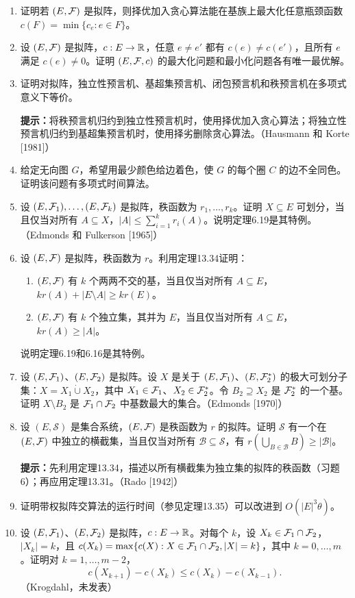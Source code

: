 \begin{enumerate}[label=\arabic*.,start=14]
\item 证明若 $(E,\mathcal F)$ 是拟阵，则择优加入贪心算法能在基族上最大化任意瓶颈函数 $c(F)=\min\{c_e:e\in F\}$。
\item 设 $(E,\mathcal F)$ 是拟阵，$c:E\to\mathbb R$，任意 $e\ne e'$ 都有 $c(e)\ne c(e')$，且所有 $e$ 满足 $c(e)\ne0$。证明 $(E,\mathcal F,c)$ 的最大化问题和最小化问题各有唯一最优解。
\item[$16.^*$] 证明对拟阵，独立性预言机、基超集预言机、闭包预言机和秩预言机在多项式意义下等价。\par
\textbf{提示：}将秩预言机归约到独立性预言机时，使用择优加入贪心算法；将独立性预言机归约到基超集预言机时，使用择劣删除贪心算法。（Hausmann 和 Korte [1981]）
\setcounter{enumi}{16}
\item 给定无向图 $G$，希望用最少颜色给边着色，使 $G$ 的每个圈 $C$ 的边不全同色。证明该问题有多项式时间算法。
\item 设 $(E,\mathcal F_1),\ldots,(E,\mathcal F_k)$ 是拟阵，秩函数为 $r_1,\ldots,r_k$。证明 $X\subseteq E$ 可划分，当且仅当对所有 $A\subseteq X$，$|A|\le\sum_{i=1}^kr_i(A)$。说明定理6.19是其特例。（Edmonds 和 Fulkerson [1965]）
\item 设 $(E,\mathcal F)$ 是拟阵，秩函数为 $r$。利用定理13.34证明：
\begin{enumerate}[label=(\alph*)]
\item $(E,\mathcal F)$ 有 $k$ 个两两不交的基，当且仅当对所有 $A\subseteq E$，$kr(A)+|E\setminus A|\ge kr(E)$。
\item $(E,\mathcal F)$ 有 $k$ 个独立集，其并为 $E$，当且仅当对所有 $A\subseteq E$，$kr(A)\ge|A|$。
\end{enumerate}
说明定理6.19和6.16是其特例。
\item 设 $(E,\mathcal F_1)$、$(E,\mathcal F_2)$ 是拟阵。设 $X$ 是关于 $(E,\mathcal F_1)$、$(E,\mathcal F_2^*)$ 的极大可划分子集：$X=X_1\mathbin{\dot\cup}X_2$，其中 $X_1\in\mathcal F_1$、$X_2\in\mathcal F_2^*$。令 $B_2\supseteq X_2$ 是 $\mathcal F_2^*$ 的一个基。证明 $X\setminus B_2$ 是 $\mathcal F_1\cap\mathcal F_2$ 中基数最大的集合。（Edmonds [1970]）
\item 设 $(E,\mathcal S)$ 是集合系统，$(E,\mathcal F)$ 是秩函数为 $r$ 的拟阵。证明 $\mathcal S$ 有一个在 $(E,\mathcal F)$ 中独立的横截集，当且仅当对所有 $\mathcal B\subseteq\mathcal S$，有 $r(\bigcup_{B\in\mathcal B}B)\ge|\mathcal B|$。\par
\textbf{提示：}先利用定理13.34，描述以所有横截集为独立集的拟阵的秩函数（习题6）；再应用定理13.31。（Rado [1942]）
\item 证明带权拟阵交算法的运行时间（参见定理13.35）可以改进到 $O(|E|^3\theta)$。
\item 设 $(E,\mathcal F_1)$、$(E,\mathcal F_2)$ 是拟阵，$c:E\to\mathbb R$。对每个 $k$，设 $X_k\in\mathcal F_1\cap\mathcal F_2$，$|X_k|=k$，且 $c(X_k)=\max\{c(X):X\in\mathcal F_1\cap\mathcal F_2,|X|=k\}$，其中 $k=0,\ldots,m$。证明对 $k=1,\ldots,m-2$，
\[c(X_{k+1})-c(X_k)\le c(X_k)-c(X_{k-1}).\]
（Krogdahl，未发表）
\end{enumerate}

